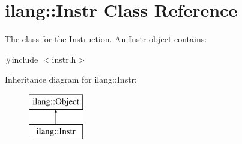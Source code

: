 \hypertarget{classilang_1_1_instr}{}\section{ilang\+:\+:Instr Class Reference}
\label{classilang_1_1_instr}


The class for the Instruction. An \mbox{\hyperlink{classilang_1_1_instr}{Instr}} object contains\+:  




{\ttfamily \#include $<$instr.\+h$>$}

Inheritance diagram for ilang\+:\+:Instr\+:\begin{figure}[H]
\begin{center}
\leavevmode
\includegraphics[height=2.000000cm]{classilang_1_1_instr}
\end{center}
\end{figure}
